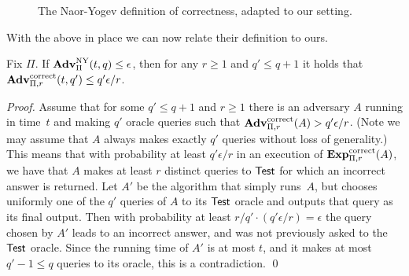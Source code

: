 \begin{figure}[htp]
\centering
{}
\caption{The Naor-Yogev definition of correctness, adapted to our setting.}
\label{fig:NYcorrectness}
\end{figure}

With the above in place we can now relate their definition to ours.
\begin{theorem}
Fix $\Pi$. If $\mathrm{\mathbf{Adv}}^{\mathrm{NY}}_{\Pi}(t,q) \leq \epsilon$, then for any $r \geq 1$ and $q' \leq q+1$ it holds that
$\mathrm{\mathbf{Adv}}^{\mathrm{correct}}_{\Pi,r}(t,q') \leq q'\epsilon/r$.
\end{theorem}
\begin{proof}
Assume that for some $q' \leq q+1$ and
$r \geq 1$
there is an adversary $A$ running in time~$t$
and making $q'$ oracle queries such that
$\mathrm{\mathbf{Adv}}^{\mathrm{correct}}_{\Pi,r}(A) > q'\epsilon/r$.
(Note
we may assume that $A$ always makes exactly $q'$ queries without loss of generality.)
This means that with probability at least
$q'\epsilon/r$ in an execution of $\mathrm{\mathbf{Exp}}^{\mathrm{correct}}_{\Pi,r}(A)$, we have that
$A$ makes at least $r$ distinct queries to $\mathsf{Test}$ for which
an incorrect answer is returned. Let $A'$ be the algorithm that simply
runs~$A$, but chooses
uniformly one of the $q'$ queries of $A$ to its $\mathsf{Test}$ oracle and outputs that query
as its final output. Then with probability at least $r/q' \cdot (q'\epsilon/r)=\epsilon$
the query chosen by $A'$
leads to an incorrect answer, and was not previously asked to the $\mathsf{Test}$ oracle.
Since the running time of $A'$ is at most $t$, and it makes at most $q'-1 \leq q$ queries
to its oracle, this is a contradiction. \hfill\qed
\end{proof}

